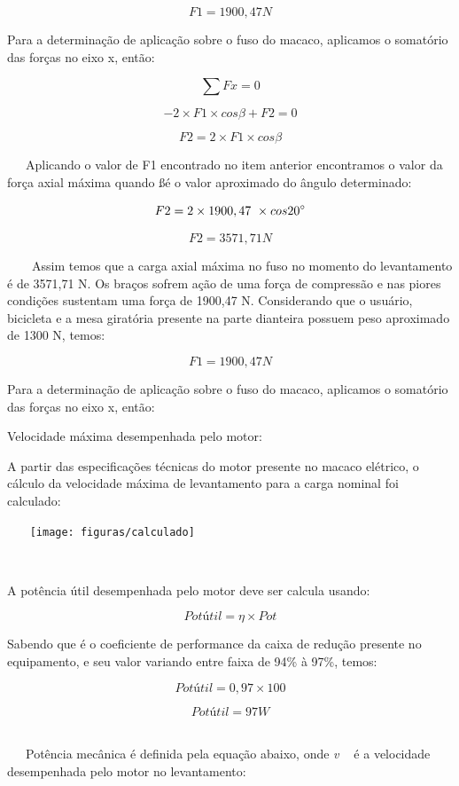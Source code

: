 \[F1 = 1900,47 N\]

Para a determinação de aplicação sobre o fuso do macaco, aplicamos o somatório das forças no eixo x, então: 

\[\sum Fx= 0\]

\[- 2 \times F1 \times cos \beta + F2 = 0 \]

\[F2 = 2 \times F1 \times cos \beta\]

   Aplicando o valor de F1 encontrado no item anterior encontramos o valor da força axial máxima quando \ss é o valor aproximado do ângulo determinado: 

\[F2 = 2 \times 1900,47  \times cos 20 \degree \]

\[F2 = 3571,71 N\] 

    Assim temos que a carga axial máxima no fuso no momento do levantamento é de 3571,71 N. Os braços sofrem ação de uma força de compressão e nas piores condições sustentam uma força de 1900,47 N.
Considerando que o usuário, bicicleta e a mesa giratória presente na parte dianteira possuem peso aproximado de 1300 N, temos: 

\[F1 = 1900,47 N\]

Para a determinação de aplicação sobre o fuso do macaco, aplicamos o somatório das forças no eixo x, então: 

Velocidade máxima desempenhada pelo motor: 

A partir das especificações técnicas do motor presente no macaco elétrico, o cálculo da velocidade máxima de levantamento para a carga nominal foi calculado: 

\begin{center}
    \texttt{[image: figuras/calculado]}
       \label{calculado}
   \end{center}   

A potência útil desempenhada pelo motor deve ser calcula usando: 

\[Pot útil = \eta \times Pot\]

Sabendo que \eta é o coeficiente de performance da caixa de redução presente no equipamento, e seu valor variando entre faixa de 94\% à 97\%, temos: 

\[Pot útil = 0,97 \times 100\]

\[Pot útil = 97 W\]                          

   Potência mecânica é definida pela equação abaixo, onde \textit{v  } é a velocidade desempenhada pelo motor no levantamento:  


